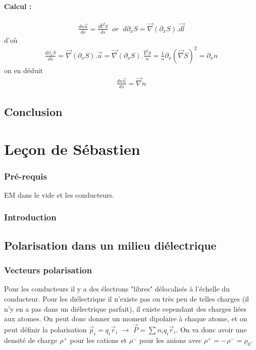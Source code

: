 \documentclass[12pt,prb,aps,epsf]{report}
\begin{document}
\subsubsection{Calcul :}
\begin{eqnarray}
\frac{dn\vec{u}}{ds} = \frac{d\vec{\nabla}S}{ds} \; \; or \;\; d\partial_xS = \vec{\nabla}(\partial_xS).\vec{dl}
\end{eqnarray}
d'où
\begin{eqnarray}
\frac{d\partial_xS}{ds} = \vec{\nabla}(\partial_xS).\vec{u} = \vec{\nabla}(\partial_xS).\frac{\vec{\nabla}S}{n} = \frac{1}{n}\partial_x(\vec{\nabla}S)^2 = \partial_xn
\end{eqnarray}
on en déduit 
\begin{eqnarray}
\frac{dn\vec{u}}{ds} = \vec{\nabla}n
\end{eqnarray}

\section{Conclusion}

\chapter{Leçon de Sébastien}
	
\subsection*{Pré-requis}
	EM dans le vide et les conducteurs.
	
\subsection{Introduction}

\section{Polarisation dans un milieu diélectrique}
\subsection{Vecteurs polarisation}
Pour les conducteurs il y a des électrons "libres" délocalisés à l'échelle du conducteur. Pour les diélectrique il n'existe pas ou très peu de telles charges (il n'y en a pas dans un diélectrique parfait), il existe cependant des charges liées aux atomes. On peut donc donner un moment dipolaire à chaque atome, et on peut définir la polarisation $\vec{p}_i = q_i\vec{r}_i$ $\rightarrow\; \vec{P} = \sum n_iq_i\vec{r}_i$. On va donc avoir une densité de charge $\rho^+$ pour les cations et $\rho^-$ pour les anions avec $\rho^+=-\rho^-=\rho_0$.
\end{document}
